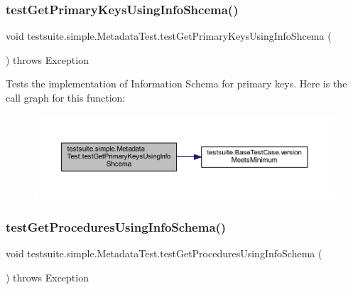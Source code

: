 \subsubsection{\texorpdfstring{test\+Get\+Primary\+Keys\+Using\+Info\+Shcema()}{testGetPrimaryKeysUsingInfoShcema()}}
{\footnotesize\ttfamily void testsuite.\+simple.\+Metadata\+Test.\+test\+Get\+Primary\+Keys\+Using\+Info\+Shcema (\begin{DoxyParamCaption}{ }\end{DoxyParamCaption}) throws Exception}

Tests the implementation of Information Schema for primary keys. Here is the call graph for this function\+:
\nopagebreak
\begin{figure}[H]
\begin{center}
\leavevmode
\includegraphics[width=350pt]{classtestsuite_1_1simple_1_1_metadata_test_aec0bf7b994940c84160bf6100daf09bd_cgraph}
\end{center}
\end{figure}
\mbox{\label{classtestsuite_1_1simple_1_1_metadata_test_a2b94ef57c9572c0d5351c4ca8201b677}} 
\subsubsection{\texorpdfstring{test\+Get\+Procedures\+Using\+Info\+Schema()}{testGetProceduresUsingInfoSchema()}}
{\footnotesize\ttfamily void testsuite.\+simple.\+Metadata\+Test.\+test\+Get\+Procedures\+Using\+Info\+Schema (\begin{DoxyParamCaption}{ }\end{DoxyParamCaption}) throws Exception}

